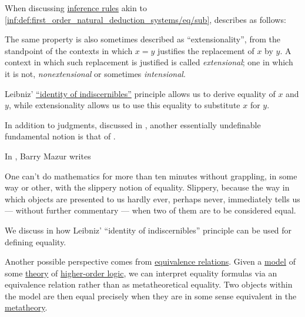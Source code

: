 \begin{concept}\label{con:extensionality}
  When discussing \hyperref[def:inference_rule]{inference rules} akin to \ref{inf:def:first_order_natural_deduction_systems/eq/sub},  describes  as follows:
  \begin{displayquote}
    The same property is also sometimes described as \enquote{extensionality}, from the standpoint of the contexts in which \( x = y \) justifies the replacement of \( x \) by \( y \). A context in which such replacement is justified is called \textit{extensional}; one in which it is not, \textit{nonextensional} or sometimes \textit{intensional}.
  \end{displayquote}
\end{concept}
\begin{comments}
  \item Leibniz' \hyperref[rem:identity_of_indiscernibles]{\enquote{identity of indiscernibles}} principle allows us to derive equality of \( x \) and \( y \), while extensionality allows us to use this equality to substitute \( x \) for \( y \).
\end{comments}

\begin{concept}\label{con:equality}
  In addition to judgments, discussed in , another essentially undefinable fundamental notion is that of .

  In \cite[\enquote{When is One Thing Equal to Some Other Thing?}, page 222]{GoldSimons2008Philosophy}, Barry Mazur writes
  \begin{displayquote}
    One can't do mathematics for more than ten minutes without grappling, in some way or other, with the slippery notion of equality. Slippery, because the way in which objects are presented to us hardly ever, perhaps never, immediately tells us --- without further commentary --- when two of them are to be considered equal.
  \end{displayquote}

  We discuss in  how Leibniz' \enquote{identity of indiscernibles} principle can be used for defining equality.

  Another possible perspective comes from \hyperref[def:equivalence_relation]{equivalence relations}. Given a \hyperref[def:institution/models]{model} of some \hyperref[def:logical_theory]{theory} of \hyperref[def:simply_typed_hol]{higher-order logic}, we can interpret equality formulas via an equivalence relation rather than as metatheoretical equality. Two objects within the model are then equal precisely when they are in some sense equivalent in the \hyperref[con:metalogic]{metatheory}.
\end{concept}

